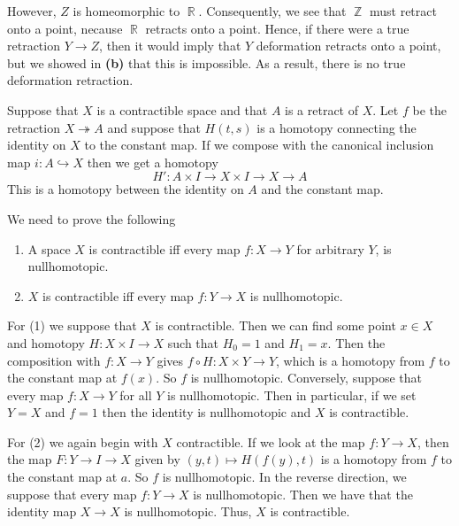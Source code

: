 \documentclass{article}
\DeclareMathOperator{\Z}{\mathbb{Z}}
\DeclareMathOperator{\R}{\mathbb{R}}
\DeclareMathOperator{\into}{\hookrightarrow}
\DeclareMathOperator{\onto}{\twoheadrightarrow}
\newcommand{\exercise}[1]{\noindent{\textbf{Exercise #1:}}}
\begin{document}
\begin{enumerate}
  However, $Z$ is homeomorphic to $\R$. Consequently, we see that $\Z$
must retract onto a point, necause $\R$ retracts onto a point. Hence,
if there were a true retraction $Y \to Z$, then it would imply that
$Y$ deformation retracts onto a point, but we showed in \textbf{(b)}
that this is impossible. As a result, there is no true deformation
retraction.
\end{enumerate}

\exercise{0.9}

Suppose that $X$ is a contractible space and that $A$ is a retract of
$X$. Let $f$ be the retraction $X \onto A$ and suppose that $H(t,s)$
is a homotopy connecting the identity on $X$ to the constant map. If
we compose with the canonical inclusion map $i: A \into X$ then we get
a homotopy
\[ H': A \times I \to X \times I \to X \to A
\] This is a homotopy between the identity on $A$ and the constant
map.

\exercise{0.10}

We need to prove the following
\begin{enumerate}
\item A space $X$ is contractible iff every map $f: X \to Y$ for
arbitrary $Y$, is nullhomotopic.
\item $X$ is contractible iff every map $f: Y \to X$ is nullhomotopic.
\end{enumerate} For (1) we suppose that $X$ is contractible. Then we
can find some point $x \in X$ and homotopy $H: X \times I \to X$ such
that $H_0 = 1$ and $H_1 = x$. Then the composition with $f: X \to Y$
gives $f \circ H: X \times Y \to Y$, which is a homotopy from $f$ to
the constant map at $f(x)$. So $f$ is nullhomotopic. Conversely,
suppose that every map $f: X \to Y$ for all $Y$ is nullhomotopic. Then
in particular, if we set $Y = X$ and $f = 1$ then the identity is
nullhomotopic and $X$ is contractible.

For (2) we again begin with $X$ contractible. If we look at the map
$f: Y \to X$, then the map $F: Y \to I \to X$ given by $(y,t) \mapsto
H(f(y),t)$ is a homotopy from $f$ to the constant map at $a$. So $f$
is nullhomotopic. In the reverse direction, we suppose that every map
$f: Y \to X$ is nullhomotopic. Then we have that the identity map $X
\to X$ is nullhomotopic. Thus, $X$ is contractible.

\exercise{A1}
\end{document}
